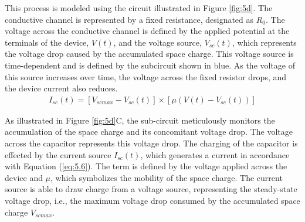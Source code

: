 
\noindent This process is modeled using the circuit illustrated in Figure \ref{fig:5d}. The conductive channel is represented by a fixed resistance, designated as $R_0$. The voltage across the conductive channel is defined by the applied potential at the terminals of the device, $V(t)$, and the voltage source, $V_{sc}(t)$, which represents the voltage drop caused by the accumulated space charge. This voltage source is time-dependent and is defined by the subcircuit shown in blue. As the voltage of this source increases over time, the voltage across the fixed resistor drops, and the device current also reduces.
\begin{align}
I_{sc}(t) = \left[ V_{scmax} - V_{sc}(t) \right] \times \left[ \mu \left( V(t) - V_{sc}(t) \right) \right] \label{eq:5.6} 
\end{align}


\noindent As illustrated in Figure \ref{fig:5d}C, the sub-circuit meticulously monitors the accumulation of the space charge and its concomitant voltage drop. The voltage across the capacitor represents this voltage drop. The charging of the capacitor is effected by the current source $I_{sc}(t)$, which generates a current in accordance with Equation (\ref{eq:5.6}). The term is defined by the voltage applied across the device and $\mu$, which symbolizes the mobility of the space charge. The current source is able to draw charge from a voltage source, representing the steady-state voltage drop, i.e., the maximum voltage drop consumed by the accumulated space charge $V_{scmax}$.

